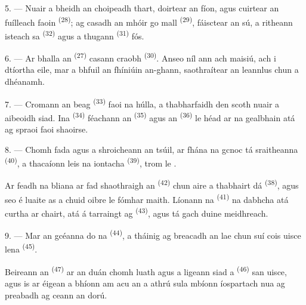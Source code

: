 5. --- Nuair a bheidh an choipeadh thart, doirtear an fíon, agus cuirtear an
fuílleach faoin  \textsuperscript{(28)}; ag casadh an
 mhóir go mall \textsuperscript{(29)}, fáisctear an sú, a ritheann
isteach sa  \textsuperscript{(32)} agus a thugann 
\textsuperscript{(31)} fós.

\VUsaut{6.0mm}
\VUsaut{3.4mm}

6. --- Ar bhalla an  \textsuperscript{(27)} casann craobh
 \textsuperscript{(30)}. Anseo níl ann ach maisiú, ach i dtíortha
eile, mar a bhfuil an fhíniúin an-ghann, saothraítear an leannlus chun
 a dhéanamh.

7. --- Cromann an  beag \textsuperscript{(33)} faoi na húlla, a
thabharfaidh  den scoth nuair a aibeoidh siad. Ina
 \textsuperscript{(34)} féachann an 
\textsuperscript{(35)} agus an  \textsuperscript{(36)} le
héad ar na gealbhain atá ag spraoi faoi shaoirse.

8. --- Chomh fada agus a shroicheann an tsúil, ar fhána na gcnoc tá sraitheanna
 \textsuperscript{(40)}, a thacaíonn leis na 
iontacha \textsuperscript{(39)}, trom le .

Ar feadh na bliana ar fad shaothraigh an 
\textsuperscript{(42)} chun aire a thabhairt dá 
\textsuperscript{(38)}, agus seo é luaite as a chuid oibre le fómhar maith.
Líonann na  \textsuperscript{(41)} na dabhcha atá curtha ar
chairt, atá á tarraingt ag  \textsuperscript{(43)}, agus tá gach
duine meidhreach.

\VUsaut{5.0mm}
\VUsaut{3.4mm}

9. --- Mar an gcéanna do na  \textsuperscript{(44)}, a
tháinig ag breacadh an lae chun suí cois uisce lena 
\textsuperscript{(45)}.

Beireann an  \textsuperscript{(47)} ar an duán chomh luath agus a
ligeann siad a  \textsuperscript{(46)} san uisce, agus is ar éigean a
bhíonn am acu an  a athrú sula mbíonn íospartach nua ag preabadh ag
ceann an dorú.

